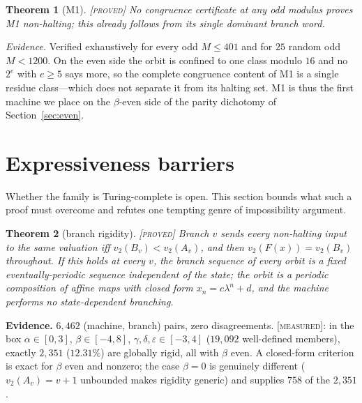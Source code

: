 \documentclass[11pt]{article}
\newtheorem{theorem}{Theorem}[section]
\theoremstyle{definition}
\theoremstyle{remark}
\newenvironment{evidence}
  {\par\smallskip\noindent\footnotesize\textbf{Evidence.}}
  {\par\smallskip}
\newcommand{\vp}[1]{v_{#1}}
\newcommand{\Proved}{\textsc{[proved]}}
\newcommand{\Meas}{\textsc{[measured]}}
\begin{document}
\begin{theorem}[M1]\label{thm:m1n1}
\Proved\; No congruence certificate at any odd modulus proves M1 non-halting;
this already follows from its single dominant branch word.
\end{theorem}

\emph{Evidence.}  Verified exhaustively for every odd $M\le401$ and for $25$
random odd $M<1200$.  On the even side the orbit is confined to one class
modulo $16$ and no $2^e$ with $e\ge5$ says more, so the complete congruence
content of M1 is a single residue class---which does not separate it from its
halting set.  M1 is thus the first machine we place on the $\beta$-even side
of the parity dichotomy of Section~\ref{sec:even}.

\section{Expressiveness barriers}
\label{sec:barriers}

Whether the family is Turing-complete is open.  This section bounds what such
a proof must overcome and refutes one tempting genre of impossibility argument.

\begin{theorem}[branch rigidity]\label{thm:rigid}
\Proved{}\; Branch $v$ sends every non-halting input to the same valuation iff
$\vp{2}(B_v)<\vp{2}(A_v)$, and then $\vp{2}(F(x))=\vp{2}(B_v)$ throughout.  If
this holds at every $v$, the branch sequence of every orbit is a fixed
eventually-periodic sequence independent of the state; the orbit is a periodic
composition of affine maps with closed form $x_n=c\lambda^{n}+d$, and the
machine performs no state-dependent branching.
\end{theorem}

\begin{evidence}
$6{,}462$ (machine, branch) pairs, zero disagreements.  \Meas{}: in the box
$\alpha\in[0,3]$, $\beta\in[-4,8]$, $\gamma,\delta,\varepsilon\in[-3,4]$
($19{,}092$ well-defined members), exactly $2{,}351$ ($12.31\%$) are globally
rigid, all with $\beta$ even.  A closed-form criterion is exact for $\beta$
even and nonzero; the case $\beta=0$ is genuinely different
($\vp{2}(A_v)=v+1$ unbounded makes rigidity generic) and supplies $758$ of the
$2{,}351$.
\end{evidence}
\end{document}
